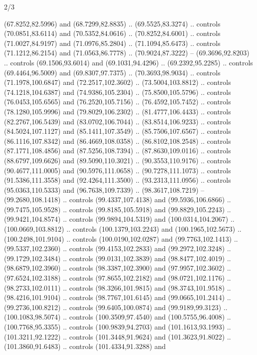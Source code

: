 \begin{flagdescription}{2/3}
\begin{scope}[shift={(0.5\flaglength,0.5)},scale=\flagwidth/320]
\begin{scope}[y=0.8pt, x=0.8pt, yscale=-1,shift={(-118.3,-146)}]
  (67.8252,82.5996) and (68.7299,82.8835) .. (69.5525,83.3274) .. controls
  (70.0851,83.6114) and (70.5352,84.0616) .. (70.8252,84.6001) .. controls
  (71.0027,84.9197) and (71.0976,85.2804) .. (71.1094,85.6473) .. controls
  (71.1212,86.2154) and (71.0563,86.7778) .. (70.9024,87.3222) --
  (69.3696,92.8203) .. controls (69.1506,93.6014) and (69.1031,94.4296) ..
  (69.2392,95.2285) .. controls (69.4464,96.5009) and (69.8307,97.7375) ..
  (70.3693,98.9034) .. controls (71.1978,100.6847) and (72.2517,102.3602) ..
  (73.5004,103.8812) .. controls (74.1218,104.6387) and (74.9386,105.2304) ..
  (75.8500,105.5796) .. controls (76.0453,105.6565) and (76.2520,105.7156) ..
  (76.4592,105.7452) .. controls (78.1280,105.9996) and (79.8029,106.2302) ..
  (81.4777,106.4433) .. controls (82.2767,106.5439) and (83.0702,106.7044) ..
  (83.8514,106.9233) .. controls (84.5024,107.1127) and (85.1411,107.3549) ..
  (85.7506,107.6567) .. controls (86.1116,107.8342) and (86.4669,108.0358) ..
  (86.8102,108.2548) .. controls (87.1771,108.4856) and (87.5256,108.7394) ..
  (87.8630,109.0116) .. controls (88.6797,109.6626) and (89.5090,110.3021) ..
  (90.3553,110.9176) .. controls (90.4677,111.0005) and (90.5976,111.0658) ..
  (90.7278,111.1073) .. controls (91.5386,111.3558) and (92.4264,111.3500) ..
  (93.2313,111.0956) .. controls (95.0363,110.5333) and (96.7638,109.7339) ..
  (98.3617,108.7219) -- (99.2680,108.1418) .. controls (99.4337,107.4138) and
  (99.5936,106.6866) .. (99.7475,105.9528) .. controls (99.8185,105.5918) and
  (99.8829,105.2243) .. (99.9421,104.8574) .. controls (99.9894,104.5319) and
  (100.0314,104.2067) .. (100.0669,103.8812) .. controls (100.1379,103.2243) and
  (100.1965,102.5673) .. (100.2498,101.9104) .. controls (100.0190,102.0287) and
  (99.7763,102.1413) .. (99.5337,102.2360) .. controls (99.4153,102.2833) and
  (99.2972,102.3248) .. (99.1729,102.3484) .. controls (99.0131,102.3839) and
  (98.8477,102.4019) .. (98.6879,102.3960) .. controls (98.3387,102.3900) and
  (97.9957,102.3602) .. (97.6524,102.3188) .. controls (97.8655,102.2182) and
  (98.0721,102.1176) .. (98.2733,102.0111) .. controls (98.3266,101.9815) and
  (98.3743,101.9518) .. (98.4216,101.9104) .. controls (98.7767,101.6145) and
  (99.0665,101.2414) .. (99.2736,100.8212) .. controls (99.6405,100.0874) and
  (99.9189,99.3123) .. (100.1083,98.5074) .. controls (100.3509,97.4540) and
  (100.5755,96.4008) .. (100.7768,95.3355) .. controls (100.9839,94.2703) and
  (101.1613,93.1993) .. (101.3211,92.1222) .. controls (101.3448,91.9624) and
  (101.3623,91.8022) .. (101.3860,91.6483) .. controls (101.4334,91.3288) and

\end{scope}
\end{scope}
\end{flagdescription}
